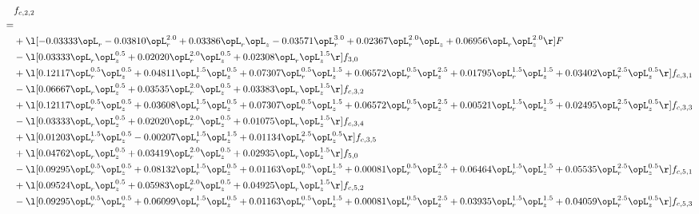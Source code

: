 \begin{alignat}{2} 
\label{eq:f_22_2} 
& f_{c,2,2} \nonumber \\ 
 = \\ 
& + \l[  -0.03333 \opL_r   -0.03810 \opL_r^{2.0} +  0.03386 \opL_r \opL_z   -0.03571 \opL_r^{3.0} +  0.02367 \opL_r^{2.0} \opL_z +  0.06956 \opL_r \opL_z^{2.0}  \r] F \nonumber \\ 
& - \l[  0.03333 \opL_r \opL_z^{0.5} +  0.02020 \opL_r^{2.0} \opL_z^{0.5} +  0.02308 \opL_r \opL_z^{1.5}  \r] f_{3,0} \nonumber \\ 
& + \l[  0.12117 \opL_r^{0.5} \opL_z^{0.5} +  0.04811 \opL_r^{1.5} \opL_z^{0.5} +  0.07307 \opL_r^{0.5} \opL_z^{1.5} +  0.06572 \opL_r^{0.5} \opL_z^{2.5} +  0.01795 \opL_r^{1.5} \opL_z^{1.5} +  0.03402 \opL_r^{2.5} \opL_z^{0.5}  \r] f_{c,3,1} \nonumber \\ 
& - \l[  0.06667 \opL_r \opL_z^{0.5} +  0.03535 \opL_r^{2.0} \opL_z^{0.5} +  0.03383 \opL_r \opL_z^{1.5}  \r] f_{c,3,2} \nonumber \\ 
& + \l[  0.12117 \opL_r^{0.5} \opL_z^{0.5} +  0.03608 \opL_r^{1.5} \opL_z^{0.5} +  0.07307 \opL_r^{0.5} \opL_z^{1.5} +  0.06572 \opL_r^{0.5} \opL_z^{2.5} +  0.00521 \opL_r^{1.5} \opL_z^{1.5} +  0.02495 \opL_r^{2.5} \opL_z^{0.5}  \r] f_{c,3,3} \nonumber \\ 
& - \l[  0.03333 \opL_r \opL_z^{0.5} +  0.02020 \opL_r^{2.0} \opL_z^{0.5} +  0.01075 \opL_r \opL_z^{1.5}  \r] f_{c,3,4} \nonumber \\ 
& + \l[  0.01203 \opL_r^{1.5} \opL_z^{0.5}   -0.00207 \opL_r^{1.5} \opL_z^{1.5} +  0.01134 \opL_r^{2.5} \opL_z^{0.5}  \r] f_{c,3,5} \nonumber \\ 
& + \l[  0.04762 \opL_r \opL_z^{0.5} +  0.03419 \opL_r^{2.0} \opL_z^{0.5} +  0.02935 \opL_r \opL_z^{1.5}  \r] f_{5,0} \nonumber \\ 
& - \l[  0.09295 \opL_r^{0.5} \opL_z^{0.5} +  0.08132 \opL_r^{1.5} \opL_z^{0.5} +  0.01163 \opL_r^{0.5} \opL_z^{1.5} +  0.00081 \opL_r^{0.5} \opL_z^{2.5} +  0.06464 \opL_r^{1.5} \opL_z^{1.5} +  0.05535 \opL_r^{2.5} \opL_z^{0.5}  \r] f_{c,5,1} \nonumber \\ 
& + \l[  0.09524 \opL_r \opL_z^{0.5} +  0.05983 \opL_r^{2.0} \opL_z^{0.5} +  0.04925 \opL_r \opL_z^{1.5}  \r] f_{c,5,2} \nonumber \\ 
& - \l[  0.09295 \opL_r^{0.5} \opL_z^{0.5} +  0.06099 \opL_r^{1.5} \opL_z^{0.5} +  0.01163 \opL_r^{0.5} \opL_z^{1.5} +  0.00081 \opL_r^{0.5} \opL_z^{2.5} +  0.03935 \opL_r^{1.5} \opL_z^{1.5} +  0.04059 \opL_r^{2.5} \opL_z^{0.5}  \r] f_{c,5,3} \nonumber \\ 

\end{alignat}
